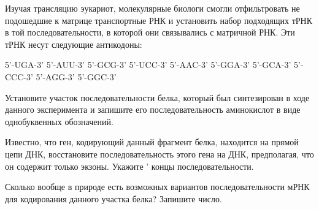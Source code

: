 
Изучая трансляцию эукариот, молекулярные биологи смогли отфильтровать не подошедшие к матрице транспортные 
РНК и установить набор подходящих тРНК в той последовательности, в которой они связывались с матричной РНК. 
Эти тРНК несут следующие антикодоны:

5'-UGA-3' 5'-AUU-3' 5'-GCG-3' 5'-UCC-3' 5'-AAC-3' 5'-GGA-3' 5'-GCA-3' 5'-CCC-3' 5'-AGG-3' 5'-GGC-3'

Установите участок последовательности белка, который был синтезирован в ходе данного эксперимента и запишите 
его последовательность аминокислот в виде однобуквенных обозначений.

Известно, что ген, кодирующий данный фрагмент белка, находится на прямой цепи ДНК, восстановите последовательность 
этого гена на ДНК, предполагая, что он содержит только экзоны. Укажите ' концы последовательности.

Сколько вообще в природе есть возможных вариантов последовательности мРНК для кодирования данного участка белка? 
Запишите число.
